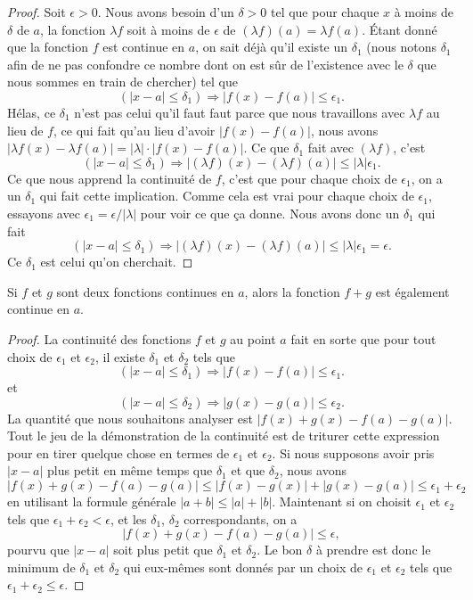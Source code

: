 \begin{proof}
Soit $\epsilon>0$. Nous avons besoin d'un $\delta>0$ tel que pour chaque $x$ à moins de $\delta$ de $a$, la fonction $\lambda f$ soit à moins de $\epsilon$ de $(\lambda f)(a)=\lambda f(a)$. Étant donné que la fonction $f$ est continue en $a$, on sait déjà qu'il existe un $\delta_1$ (nous notons $\delta_1$ afin de ne pas confondre ce nombre dont on est sûr de l'existence avec le $\delta$ que nous sommes en train de chercher) tel que
\[
  (| x-a |\leq \delta_1)\Rightarrow | f(x)-f(a) |\leq \epsilon_1.
\]
Hélas, ce $\delta_1$ n'est pas celui qu'il faut faut parce que nous travaillons avec $\lambda f$ au lieu de $f$, ce qui fait qu'au lieu d'avoir $| f(x)-f(a) |$, nous avons $| \lambda f(x)-\lambda f(a) |=| \lambda |\cdot | f(x)-f(a) |$.  Ce que $\delta_1$ fait avec $(\lambda f)$, c'est
\[
  (| x-a |\leq\delta_1)\Rightarrow  | (\lambda f)(x)- (\lambda f)(a)|\leq | \lambda |\epsilon_1.
\]
Ce que nous apprend la continuité de $f$, c'est que pour chaque choix de $\epsilon_1$, on a un $\delta_1$ qui fait cette implication. Comme cela est vrai pour chaque choix de $\epsilon_1$, essayons avec $\epsilon_1=\epsilon/| \lambda |$ pour voir ce que ça donne. Nous avons donc un $\delta_1$ qui fait
\[
  (| x-a |\leq\delta_1)\Rightarrow  | (\lambda f)(x)- (\lambda f)(a)|\leq | \lambda |\epsilon_1=\epsilon.
\]
Ce $\delta_1$ est celui qu'on cherchait.
\end{proof}

\begin{theorem}
Si $f$ et $g$ sont deux fonctions continues en $a$, alors la fonction $f+g$ est également continue en $a$.
\end{theorem}

\begin{proof}
La continuité des fonctions $f$ et $g$ au point $a$ fait en sorte que pour tout choix de $\epsilon_1$ et $\epsilon_2$, il existe $\delta_1$ et $\delta_2$ tels que
\[
  (| x-a |\leq \delta_1)\Rightarrow | f(x)-f(a) |\leq \epsilon_1.
\]
et
\[
  (| x-a |\leq \delta_2)\Rightarrow | g(x)-g(a) |\leq \epsilon_2.
\]
La quantité que nous souhaitons analyser est $| f(x)+g(x)-f(a)-g(a) |$. Tout le jeu de la démonstration de la continuité est de triturer cette expression pour en tirer quelque chose en termes de $\epsilon_1$ et $\epsilon_2$. Si nous supposons avoir pris $| x-a |$ plus petit en même temps que $\delta_1$ et que $\delta_2$, nous avons
\[
| f(x)+g(x)-f(a)-g(a) |\leq| f(x)-g(x) |+| g(x)-g(a) |\leq\epsilon_1+\epsilon_2
\]
en utilisant la formule générale $| a+b |\leq | a |+| b |$. Maintenant si on choisit $\epsilon_1$ et $\epsilon_2$ tels que $\epsilon_1+\epsilon_2<\epsilon$, et les $\delta_1$, $\delta_2$ correspondants, on a
\[
| f(x)+g(x)-f(a)-g(a) |\leq\epsilon,
\]
pourvu que $| x-a |$ soit plus petit que $\delta_1$ et $\delta_2$. Le bon $\delta$ à prendre est donc le minimum de $\delta_1$ et $\delta_2$ qui eux-mêmes sont donnés par un choix de $\epsilon_1$ et $\epsilon_2$ tels que $\epsilon_1+\epsilon_2\leq\epsilon$.
\end{proof}

